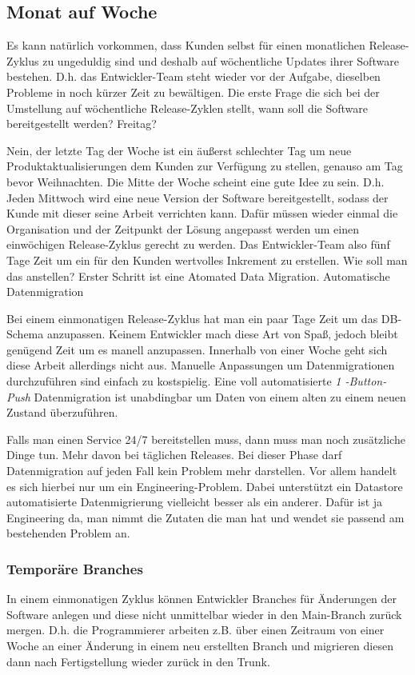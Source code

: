 \subsection{Monat auf Woche}
\label{subsec:monat-auf-woche}

Es kann natürlich vorkommen, dass Kunden selbst für einen monatlichen Release-
Zyklus zu ungeduldig sind und deshalb auf wöchentliche Updates ihrer Software
bestehen. D.h. das Entwickler-Team steht wieder vor der Aufgabe, dieselben
Probleme in noch kürzer Zeit zu bewältigen. Die erste Frage die sich bei der
Umstellung auf wöchentliche Release-Zyklen stellt, wann soll die Software
bereitgestellt werden? Freitag?

Nein, der letzte Tag der Woche ist ein äußerst schlechter Tag um neue
Produktaktualisierungen dem Kunden zur Verfügung zu stellen, genauso am Tag
bevor Weihnachten. Die Mitte der Woche scheint eine gute Idee zu sein. D.h.
Jeden Mittwoch wird eine neue Version der Software bereitgestellt, sodass der
Kunde mit dieser seine Arbeit verrichten kann. Dafür müssen wieder einmal die
Organisation und der Zeitpunkt der Lösung angepasst werden um einen
einwöchigen Release-Zyklus gerecht zu werden. Das Entwickler-Team also fünf
Tage Zeit um ein für den Kunden wertvolles Inkrement zu erstellen. Wie soll
man das anstellen? Erster Schritt ist eine Atomated Data Migration.
Automatische Datenmigration

Bei einem einmonatigen Release-Zyklus hat man ein paar Tage Zeit um das DB-
Schema anzupassen. Keinem Entwickler mach diese Art von Spaß, jedoch bleibt
genügend Zeit um es manell anzupassen. Innerhalb von einer Woche geht sich
diese Arbeit allerdings nicht aus. Manuelle Anpassungen um Datenmigrationen
durchzuführen sind einfach zu kostspielig. Eine voll automatisierte \emph{1
-Button-Push} Datenmigration ist unabdingbar um Daten von einem alten zu einem
neuen Zustand überzuführen.

Falls man einen Service 24/7 bereitstellen muss, dann muss man noch
zusätzliche Dinge tun. Mehr davon bei täglichen Releases. Bei dieser Phase
darf Datenmigration auf jeden Fall kein Problem mehr darstellen. Vor allem
handelt es sich hierbei nur um ein Engineering-Problem. Dabei unterstützt ein
Datastore automatisierte Datenmigrierung vielleicht besser als ein anderer.
Dafür ist ja Engineering da, man nimmt die Zutaten die man hat und wendet sie
passend am bestehenden Problem an.

\subsubsection{Temporäre Branches}
In einem einmonatigen Zyklus können Entwickler Branches für Änderungen der
Software anlegen und diese nicht unmittelbar wieder in den Main-Branch zurück
mergen. D.h. die Programmierer arbeiten z.B. über einen Zeitraum von einer
Woche an einer Änderung in einem neu erstellten Branch und migrieren diesen
dann nach Fertigstellung wieder zurück in den Trunk.

